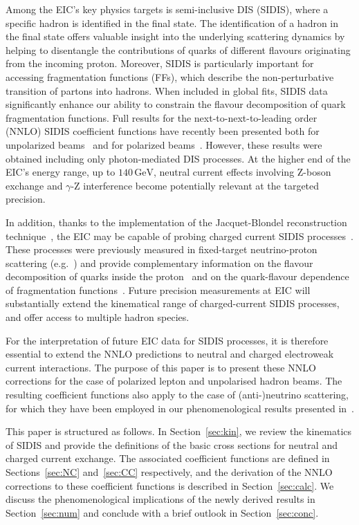 \documentclass[11pt,a4paper]{article}
\begin{document}
Among the EIC’s key physics targets is semi-inclusive DIS (SIDIS), where a specific hadron is identified in the final state.
The identification of a hadron in the final state offers valuable insight into the underlying scattering dynamics by helping to disentangle the contributions of quarks of different flavours originating from the incoming proton.
Moreover, SIDIS is particularly important for accessing fragmentation functions (FFs), which describe the non-perturbative transition of partons into hadrons.
When included in global fits, SIDIS data significantly enhance our ability to constrain the flavour decomposition of quark fragmentation functions.
%
Full results for the next-to-next-to-leading order (NNLO) SIDIS coefficient functions have recently been presented both for unpolarized beams~\cite{Goyal:2023zdi,Bonino:2024qbh,Goyal:2024emo} and for polarized beams~\cite{Bonino:2024wgg,Goyal:2024tmo}.
However, these results were obtained including only photon-mediated DIS processes.
At the higher end of the EIC’s energy range, up to $140\,\mathrm{GeV}$, neutral current effects involving Z-boson exchange and $\gamma$-Z interference become potentially relevant at the targeted precision.

In addition, thanks to the implementation of the Jacquet-Blondel reconstruction technique~\cite{Amaldi:1979yh}, the EIC may be capable of probing charged current SIDIS processes~\cite{AbdulKhalek:2021gbh}.
These processes were previously measured in fixed-target  neutrino-proton scattering (e.g.~\cite{Aachen-Bonn-CERN-Munich-Oxford:1982jrr})
and
provide complementary information on the flavour decomposition of quarks inside the proton~\cite{Helenius:2024fow,Paukkunen:2025kjb} and
on the quark-flavour dependence of fragmentation functions~\cite{Bonino:2025tnf}.
Future precision measurements at EIC will substantially extend the kinematical range of charged-current SIDIS
processes, and offer access to multiple hadron species.

For the interpretation of future EIC data for SIDIS processes, it
is  therefore  essential to extend the NNLO predictions
to neutral and charged electroweak current interactions.
The purpose of this paper is to present these NNLO corrections for the case of polarized lepton and
 unpolarised hadron beams. The resulting coefficient functions also apply to the case of  (anti-)neutrino scattering,
 for which they have been employed in our phenomenological results presented in~\cite{Bonino:2025tnf}.

 This paper is structured as follows. In Section~\ref{sec:kin}, we review the kinematics of SIDIS and provide the
 definitions of the basic cross sections for neutral and charged current exchange. The associated coefficient functions
 are defined in Sections~\ref{sec:NC} and~\ref{sec:CC} respectively, and the derivation of the NNLO corrections
 to these coefficient functions is described in Section~\ref{sec:calc}. We discuss the phenomenological implications of the
 newly derived results in Section~\ref{sec:num} and conclude with a brief outlook in Section~\ref{sec:conc}.
\end{document}
